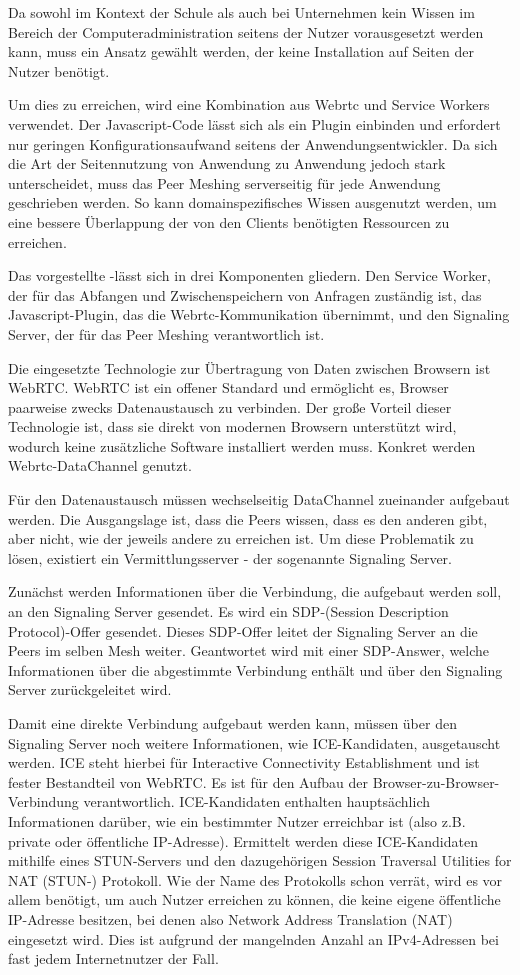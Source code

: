 Da sowohl im Kontext der Schule als auch bei Unternehmen kein Wissen im Bereich der Computeradministration seitens der Nutzer vorausgesetzt werden kann, muss ein Ansatz gewählt werden, der keine Installation auf Seiten der Nutzer benötigt.

Um dies zu erreichen, wird eine Kombination aus Webrtc und Service Workers verwendet. Der Javascript-Code lässt sich als ein Plugin einbinden und erfordert nur geringen Konfigurationsaufwand seitens der Anwendungsentwickler. Da sich die Art der Seitennutzung von Anwendung zu Anwendung jedoch stark unterscheidet, muss das Peer Meshing serverseitig für jede Anwendung geschrieben werden. So kann domainspezifisches Wissen ausgenutzt werden, um eine bessere Überlappung der von den Clients benötigten Ressourcen zu erreichen.

Das vorgestellte \pTp-\cdn lässt sich in drei Komponenten gliedern. Den Service Worker, der für das Abfangen und Zwischenspeichern von Anfragen zuständig ist, das Javascript-Plugin, das die Webrtc-Kommunikation übernimmt, und den Signaling Server, der für das Peer Meshing verantwortlich ist.

Die eingesetzte Technologie zur Übertragung von Daten zwischen Browsern ist WebRTC. WebRTC ist ein offener Standard und ermöglicht es, Browser paarweise zwecks Datenaustausch zu verbinden. Der große Vorteil dieser Technologie ist, dass sie direkt von modernen Browsern unterstützt wird, wodurch keine zusätzliche Software installiert werden muss. Konkret werden Webrtc-DataChannel genutzt.

Für den Datenaustausch müssen wechselseitig DataChannel zueinander aufgebaut werden. Die Ausgangslage ist, dass die Peers wissen, dass es den anderen gibt, aber nicht, wie der jeweils andere zu erreichen ist. Um diese Problematik zu lösen, existiert ein Vermittlungsserver - der sogenannte Signaling Server.

Zunächst werden Informationen über die Verbindung, die aufgebaut werden soll, an den Signaling Server gesendet. Es wird ein SDP-(Session Description Protocol)-Offer gesendet. Dieses SDP-Offer leitet der Signaling Server an die Peers im selben Mesh weiter. Geantwortet wird mit einer SDP-Answer, welche Informationen über die abgestimmte Verbindung enthält und über den Signaling Server zurückgeleitet wird.

Damit eine direkte Verbindung aufgebaut werden kann, müssen über den Signaling Server noch weitere Informationen, wie ICE-Kandidaten, ausgetauscht werden. ICE steht hierbei für Interactive Connectivity Establishment und ist fester Bestandteil von WebRTC. Es ist für den Aufbau der Browser-zu-Browser-Verbindung verantwortlich. ICE-Kandidaten enthalten hauptsächlich Informationen darüber, wie ein bestimmter Nutzer erreichbar ist (also z.B. private oder öffentliche IP-Adresse). Ermittelt werden diese ICE-Kandidaten mithilfe eines STUN-Servers und den dazugehörigen Session Traversal Utilities for NAT (STUN-) Protokoll. Wie der Name des Protokolls schon verrät, wird es vor allem benötigt, um auch Nutzer erreichen zu können, die keine eigene öffentliche IP-Adresse besitzen, bei denen also Network Address Translation (NAT) eingesetzt wird. Dies ist aufgrund der mangelnden Anzahl an IPv4-Adressen bei fast jedem Internetnutzer der Fall.


